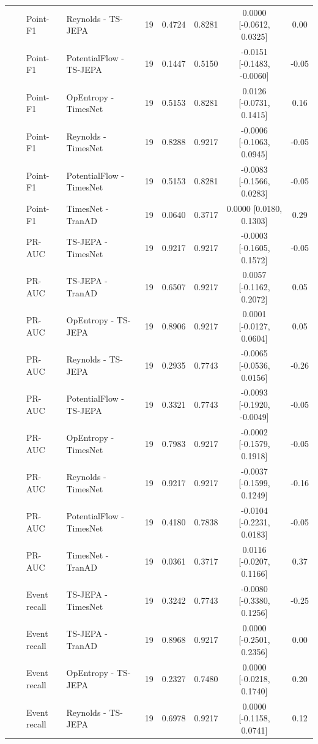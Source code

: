 {\begin{longtable}{@{}llllccccc@{}}
 &  & Point-F1 & Reynolds - TS-JEPA & 19 & 0.4724 & 0.8281 & 0.0000 [-0.0612, 0.0325] & 0.00 \\
 &  & Point-F1 & PotentialFlow - TS-JEPA & 19 & 0.1447 & 0.5150 & -0.0151 [-0.1483, -0.0060] & -0.05 \\
 &  & Point-F1 & OpEntropy - TimesNet & 19 & 0.5153 & 0.8281 & 0.0126 [-0.0731, 0.1415] & 0.16 \\
 &  & Point-F1 & Reynolds - TimesNet & 19 & 0.8288 & 0.9217 & -0.0006 [-0.1063, 0.0945] & -0.05 \\
 &  & Point-F1 & PotentialFlow - TimesNet & 19 & 0.5153 & 0.8281 & -0.0083 [-0.1566, 0.0283] & -0.05 \\
 &  & Point-F1 & TimesNet - TranAD & 19 & 0.0640 & 0.3717 & 0.0000 [0.0180, 0.1303] & 0.29 \\
 &  & PR-AUC & TS-JEPA - TimesNet & 19 & 0.9217 & 0.9217 & -0.0003 [-0.1605, 0.1572] & -0.05 \\
 &  & PR-AUC & TS-JEPA - TranAD & 19 & 0.6507 & 0.9217 & 0.0057 [-0.1162, 0.2072] & 0.05 \\
 &  & PR-AUC & OpEntropy - TS-JEPA & 19 & 0.8906 & 0.9217 & 0.0001 [-0.0127, 0.0604] & 0.05 \\
 &  & PR-AUC & Reynolds - TS-JEPA & 19 & 0.2935 & 0.7743 & -0.0065 [-0.0536, 0.0156] & -0.26 \\
 &  & PR-AUC & PotentialFlow - TS-JEPA & 19 & 0.3321 & 0.7743 & -0.0093 [-0.1920, -0.0049] & -0.05 \\
 &  & PR-AUC & OpEntropy - TimesNet & 19 & 0.7983 & 0.9217 & -0.0002 [-0.1579, 0.1918] & -0.05 \\
 &  & PR-AUC & Reynolds - TimesNet & 19 & 0.9217 & 0.9217 & -0.0037 [-0.1599, 0.1249] & -0.16 \\
 &  & PR-AUC & PotentialFlow - TimesNet & 19 & 0.4180 & 0.7838 & -0.0104 [-0.2231, 0.0183] & -0.05 \\
 &  & PR-AUC & TimesNet - TranAD & 19 & 0.0361 & 0.3717 & 0.0116 [-0.0207, 0.1166] & 0.37 \\
 &  & Event recall & TS-JEPA - TimesNet & 19 & 0.3242 & 0.7743 & -0.0080 [-0.3380, 0.1256] & -0.25 \\
 &  & Event recall & TS-JEPA - TranAD & 19 & 0.8968 & 0.9217 & 0.0000 [-0.2501, 0.2356] & 0.00 \\
 &  & Event recall & OpEntropy - TS-JEPA & 19 & 0.2327 & 0.7480 & 0.0000 [-0.0218, 0.1740] & 0.20 \\
 &  & Event recall & Reynolds - TS-JEPA & 19 & 0.6978 & 0.9217 & 0.0000 [-0.1158, 0.0741] & 0.12 \\

\end{longtable}}
